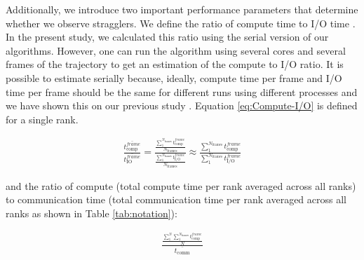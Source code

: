 Additionally, we introduce two important performance parameters that determine whether we observe stragglers.
We define the ratio of compute time to I/O time . 
In the present study, we calculated this ratio using the serial version of our algorithms.
However, one can run the algorithm using several cores and several frames of the trajectory to get an estimation of the compute to I/O ratio. 
It is possible to estimate  serially because, ideally, compute time per frame and I/O time per frame should be the same for different runs using different processes and we have shown this on our previous study \cite{Khoshlessan:2017ab}. Equation \ref{eq:Compute-I/O} is defined for a single rank.
 

\begin{gather}
  \label{eq:Compute-I/O}
    \frac{\overline{t_{\text{comp}}^{frame}}}{\overline{t_{\text{IO}}^{frame}}} = \frac{\frac{\sum_{1}^{N_{\text{frames}}}t_{\text{comp}}^{frame}}{N_{\text{frames}}}}{\frac{\sum_{1}^{N_{\text{frames}}}t_{\text{I/O}}^{frame}}{N_{\text{frames}}}} \approx \frac{\sum_{1}^{N_{\text{frames}}}t_{\text{comp}}^{frame}}{\sum_{1}^{N_{\text{frames}}}t_{\text{I/O}}^{frame}} 
 \end{gather}

and the ratio of compute (total compute time per rank averaged across all ranks) to communication time (total communication time per rank averaged across all ranks as shown in Table \ref{tab:notation}):

\begin{gather}
  \label{eq:Compute-comm}
    \frac{\frac{\sum_{1}^{N}\sum_{1}^{N_{\text{frames}}}t_{\text{comp}}^{frame}}{N}}{\overline{t_{\text{comm}}}}  
 \end{gather}
 
